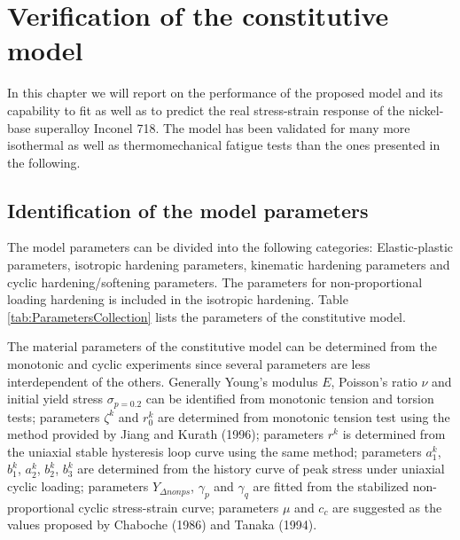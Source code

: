 \chapter{Verification of the constitutive model}

In this chapter we will report on the performance of the proposed model and its capability to fit as well as to predict the real stress-strain response of the nickel-base superalloy Inconel 718.
The model has been validated for many more isothermal as well as thermomechanical fatigue tests than the ones presented in the following.

\section{Identification of the model parameters}
The model parameters can be divided into the following categories: Elastic-plastic parameters, isotropic hardening parameters, kinematic hardening parameters and cyclic hardening/softening parameters. The parameters for non-proportional loading hardening is included in the isotropic hardening.
Table \ref{tab:ParametersCollection} lists the parameters of the constitutive model.

The material parameters of the constitutive model can be determined from the monotonic and cyclic experiments since several parameters are less interdependent of the others.
Generally Young's modulus $E$, Poisson's ratio $\nu$ and initial yield stress $\sigma_{p=0.2}$ can be identified from monotonic tension and torsion tests;
parameters $\zeta^k$ and $r_0^k$ are determined from monotonic tension test using the method provided by Jiang and Kurath (1996)\cite{Jiang1996387};
parameters $r^k$ is determined from the uniaxial stable hysteresis loop curve using the same method;
parameters $a_1^k$, $b_1^k$, $a_2^k$, $b_2^k$, $b_3^k$ are determined from the history curve of peak stress under uniaxial cyclic loading;
parameters $Y_{\Delta nonps}$, $\gamma_p$ and $\gamma_q$ are fitted from the stabilized non-proportional cyclic stress-strain curve;
parameters $\mu$ and $c_c$ are suggested as the values proposed by Chaboche (1986)\cite{Chaboche1986149} and Tanaka (1994)\cite{tanaka1994nonproportionality}.


